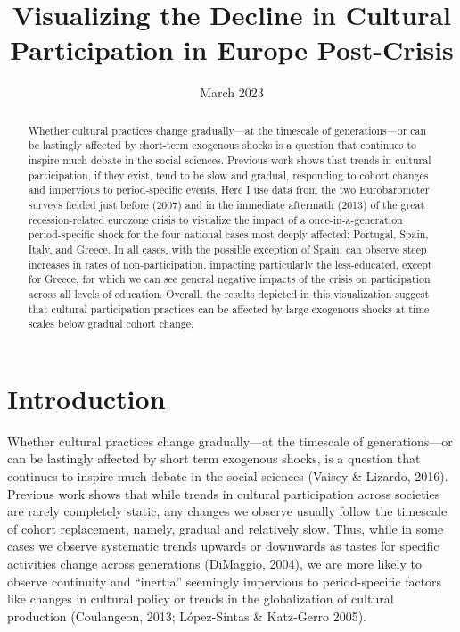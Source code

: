 \documentclass{article}
\title{Visualizing the Decline in Cultural Participation in Europe Post-Crisis}
\date{March 2023}
\begin{document}
\maketitle

\begin{abstract}
Whether cultural practices change gradually—at the timescale of generations—or can be lastingly affected by short-term exogenous shocks is a question that continues to inspire much debate in the social sciences. Previous work shows that trends in cultural participation, if they exist, tend to be slow and gradual, responding to cohort changes and impervious to period-specific events. Here I use data from the two Eurobarometer surveys fielded just before (2007) and in the immediate aftermath (2013) of the great recession-related eurozone crisis to visualize the impact of a once-in-a-generation period-specific shock for the four national cases most deeply affected: Portugal, Spain, Italy, and Greece. In all cases, with the possible exception of Spain, can observe steep increases in rates of non-participation, impacting particularly the less-educated, except for Greece, for which we can see general negative impacts of the crisis on participation across all levels of education. Overall, the results depicted in this visualization suggest that cultural participation practices can be affected by large exogenous shocks at time scales below gradual cohort change.
\end{abstract}

\section{Introduction}
Whether cultural practices change gradually---at the timescale of generations---or can be lastingly affected by short term exogenous shocks, is a question that continues to inspire much debate in the social sciences (Vaisey \& Lizardo, 2016). Previous work shows that while trends in cultural participation across societies are rarely completely static, any changes we observe usually follow the timescale of cohort replacement, namely, gradual and relatively slow. Thus, while in some cases we observe systematic trends upwards or downwards as tastes for specific activities change across generations (DiMaggio, 2004), we are more likely to observe continuity and ``inertia'' seemingly impervious to period-specific factors like changes in cultural policy or trends in the globalization of cultural production (Coulangeon, 2013; López-Sintas \& Katz-Gerro 2005).
\end{document}
